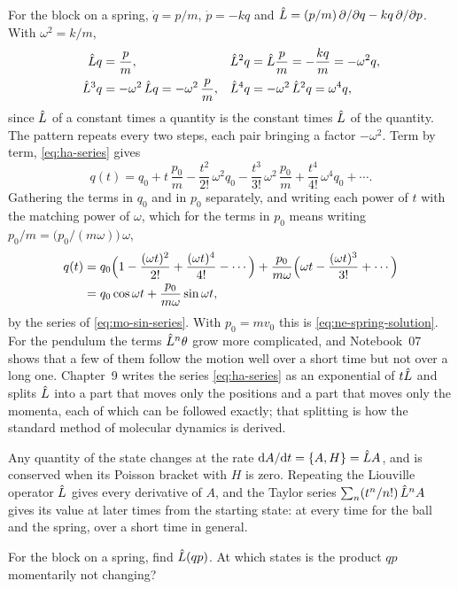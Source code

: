 For the block on a spring, $\dot{q} = p/m$, $\dot{p} = -kq$ and $\hat{L} =
(p/m)\,\partial/\partial q - kq\,\partial/\partial p$. With $\omega^2 =
k/m$,
\begin{align*}
   \hat{L} q &= \frac{p}{m} ,
   & \hat{L}^2q &= \hat{L}\frac{p}{m} = -\frac{kq}{m} = -\omega^2q ,\\
   \hat{L}^3q &= -\omega^2\,\hat{L} q = -\omega^2\,\frac{p}{m} ,
   & \hat{L}^4q &= -\omega^2\,\hat{L}^2q = \omega^4q ,
\end{align*}
since $\hat{L}$ of a constant times a quantity is the constant times $\hat{L}$
of the quantity. The pattern repeats every two steps, each pair bringing
a factor $-\omega^2$. Term by term, \cref{eq:ha-series} gives
\begin{equation*}
   q(t) = q_0 + t\,\frac{p_0}{m} - \frac{t^2}{2!}\,\omega^2q_0
   - \frac{t^3}{3!}\,\omega^2\,\frac{p_0}{m} + \frac{t^4}{4!}\,\omega^4q_0
   + \dotsb .
\end{equation*}
Gathering the terms in $q_0$ and in $p_0$ separately, and writing each
power of $t$ with the matching power of $\omega$, which for the terms in
$p_0$ means writing $p_0/m = \bigl(p_0/(m\omega)\bigr)\,\omega$,
\begin{align*}
   q(t) &= q_0\Bigl(1 - \frac{(\omega t)^2}{2!} + \frac{(\omega t)^4}{4!}
   - \dotsb\Bigr)
   + \frac{p_0}{m\omega}\Bigl(\omega t - \frac{(\omega t)^3}{3!}
   + \dotsb\Bigr)\\
   &= q_0\cos\omega t + \frac{p_0}{m\omega}\sin\omega t ,
\end{align*}
by the series of \cref{eq:mo-sin-series}. With $p_0 = mv_0$ this is
\cref{eq:ne-spring-solution}. For the pendulum the terms $\hat{L}^n\theta$
grow more complicated, and Notebook~07 shows that a few of them follow
the motion well over a short time but not over a long one. Chapter~9 writes
the series \cref{eq:ha-series} as an exponential of $t\hat{L}$ and splits
$\hat{L}$ into a part that moves only the positions and a part that moves
only the momenta, each of which can be followed exactly; that splitting is
how the standard method of molecular dynamics is derived.

\begin{keyidea}
Any quantity of the state changes at the rate $\mathrm{d} A/\mathrm{d} t = \{A, H\} =
\hat{L} A$, and is conserved when its Poisson bracket with $H$ is zero.
Repeating the Liouville operator $\hat{L}$ gives every derivative of $A$, and
the Taylor series $\sum_n(t^n/n!)\,\hat{L}^nA$ gives its value at later
times from the starting state: at every time for the ball and the spring,
over a short time in general.
\end{keyidea}


\begin{selfcheck}
For the block on a spring, find $\hat{L}(qp)$. At which states is the
product $qp$ momentarily not changing?
\end{selfcheck}
